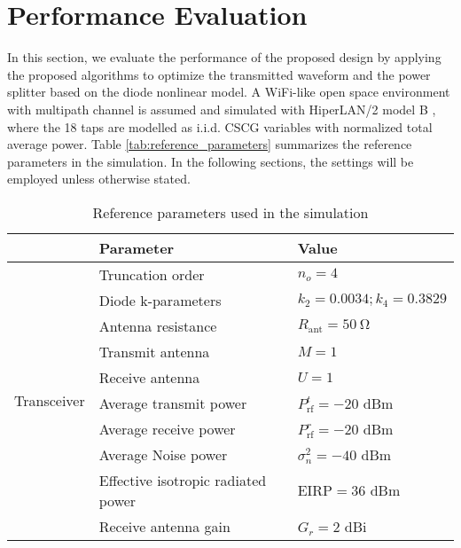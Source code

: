\chapter{Performance Evaluation}
In this section, we evaluate the performance of the proposed design by applying the proposed algorithms to optimize the transmitted waveform and the power splitter based on the diode nonlinear model. A WiFi-like open space environment with multipath channel is assumed and simulated with HiperLAN/2 model B \cite{Medbo1998}, where the 18 taps are modelled as i.i.d. CSCG variables with normalized total average power. Table \ref{tab:reference_parameters} summarizes the reference parameters in the simulation. In the following sections, the settings will be employed unless otherwise stated.

\begin{table}[h!]
\caption{Reference parameters used in the simulation}
\begin{tabular}{lll}
                              & Parameter                          & Value                                \\ \hline
\multirow{11}{*}{Transceiver} & Truncation order                   & ${n_o} = 4$                          \\
                              & Diode k-parameters                 & ${k_2} = 0.0034;{k_4} = 0.3829$      \\
                              & Antenna resistance                 & ${R_{{\text{ant}}}} = \SI{50}{\ohm}$ \\
                              & Transmit antenna                   & $M = 1$                              \\
                              & Receive antenna                    & $U = 1$                              \\
                              & Average transmit power             & $P_{{\text{rf}}}^t =  - 20$ dBm      \\
                              & Average receive power              & $P_{{\text{rf}}}^r =  - 20$ dBm      \\
                              & Average Noise power                & $\sigma _n^2 =  - 40$ dBm            \\
                              & Effective isotropic radiated power & $\text{EIRP} = 36$ dBm               \\
                              & Receive antenna gain               & ${G_r} = 2$ dBi                      \\

\end{tabular}
\end{table}
